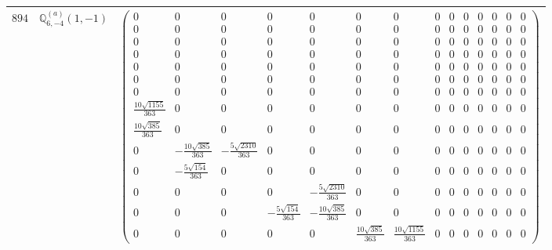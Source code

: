 \documentclass[fleqn,8pt,landscape]{jsarticle}
\begin{document}
\begin{center}
\begin{longtable}{ccc}
$ 894 $ & $ \mathbb{Q}_{6,-4}^{(a)}(1,-1) $ & $ \begin{pmatrix} 0 & 0 & 0 & 0 & 0 & 0 & 0 & 0 & 0 & 0 & 0 & 0 & 0 & 0 \\ 0 & 0 & 0 & 0 & 0 & 0 & 0 & 0 & 0 & 0 & 0 & 0 & 0 & 0 \\ 0 & 0 & 0 & 0 & 0 & 0 & 0 & 0 & 0 & 0 & 0 & 0 & 0 & 0 \\ 0 & 0 & 0 & 0 & 0 & 0 & 0 & 0 & 0 & 0 & 0 & 0 & 0 & 0 \\ 0 & 0 & 0 & 0 & 0 & 0 & 0 & 0 & 0 & 0 & 0 & 0 & 0 & 0 \\ 0 & 0 & 0 & 0 & 0 & 0 & 0 & 0 & 0 & 0 & 0 & 0 & 0 & 0 \\ 0 & 0 & 0 & 0 & 0 & 0 & 0 & 0 & 0 & 0 & 0 & 0 & 0 & 0 \\ \frac{10 \sqrt{1155}}{363} & 0 & 0 & 0 & 0 & 0 & 0 & 0 & 0 & 0 & 0 & 0 & 0 & 0 \\ \frac{10 \sqrt{385}}{363} & 0 & 0 & 0 & 0 & 0 & 0 & 0 & 0 & 0 & 0 & 0 & 0 & 0 \\ 0 & - \frac{10 \sqrt{385}}{363} & - \frac{5 \sqrt{2310}}{363} & 0 & 0 & 0 & 0 & 0 & 0 & 0 & 0 & 0 & 0 & 0 \\ 0 & - \frac{5 \sqrt{154}}{363} & 0 & 0 & 0 & 0 & 0 & 0 & 0 & 0 & 0 & 0 & 0 & 0 \\ 0 & 0 & 0 & 0 & - \frac{5 \sqrt{2310}}{363} & 0 & 0 & 0 & 0 & 0 & 0 & 0 & 0 & 0 \\ 0 & 0 & 0 & - \frac{5 \sqrt{154}}{363} & - \frac{10 \sqrt{385}}{363} & 0 & 0 & 0 & 0 & 0 & 0 & 0 & 0 & 0 \\ 0 & 0 & 0 & 0 & 0 & \frac{10 \sqrt{385}}{363} & \frac{10 \sqrt{1155}}{363} & 0 & 0 & 0 & 0 & 0 & 0 & 0 \end{pmatrix} $ \\ \hline

\end{longtable}
\end{center}
\end{document}
